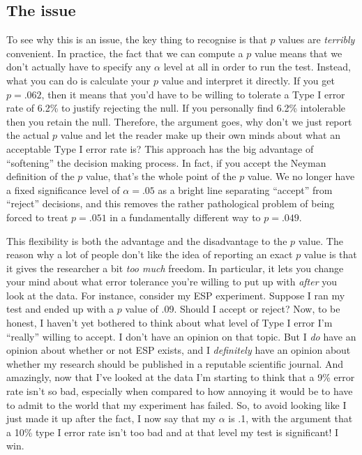 \documentclass[
]{book}
\begin{document}
\hypertarget{the-issue}{%
\subsection{The issue}\label{the-issue}}

To see why this is an issue, the key thing to recognise is that \(p\) values are \emph{terribly} convenient. In practice, the fact that we can compute a \(p\) value means that we don't actually have to specify any \(\alpha\) level at all in order to run the test. Instead, what you can do is calculate your \(p\) value and interpret it directly. If you get \(p = .062\), then it means that you'd have to be willing to tolerate a Type I error rate of 6.2\% to justify rejecting the null. If you personally find 6.2\% intolerable then you retain the null. Therefore, the argument goes, why don't we just report the actual \(p\) value and let the reader make up their own minds about what an acceptable Type I error rate is? This approach has the big advantage of ``softening'' the decision making process. In fact, if you accept the Neyman definition of the \(p\) value, that's the whole point of the \(p\) value. We no longer have a fixed significance level of \(\alpha = .05\) as a bright line separating ``accept'' from ``reject'' decisions, and this removes the rather pathological problem of being forced to treat \(p = .051\) in a fundamentally different way to \(p = .049\).

This flexibility is both the advantage and the disadvantage to the \(p\) value. The reason why a lot of people don't like the idea of reporting an exact \(p\) value is that it gives the researcher a bit \emph{too much} freedom. In particular, it lets you change your mind about what error tolerance you're willing to put up with \emph{after} you look at the data. For instance, consider my ESP experiment. Suppose I ran my test and ended up with a \(p\) value of .09. Should I accept or reject? Now, to be honest, I haven't yet bothered to think about what level of Type I error I'm ``really'' willing to accept. I don't have an opinion on that topic. But I \emph{do} have an opinion about whether or not ESP exists, and I \emph{definitely} have an opinion about whether my research should be published in a reputable scientific journal. And amazingly, now that I've looked at the data I'm starting to think that a 9\% error rate isn't so bad, especially when compared to how annoying it would be to have to admit to the world that my experiment has failed. So, to avoid looking like I just made it up after the fact, I now say that my \(\alpha\) is .1, with the argument that a 10\% type I error rate isn't too bad and at that level my test is significant! I win.
\end{document}
